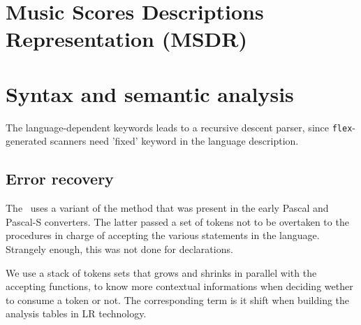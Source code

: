 \section{Music Scores Descriptions Representation (MSDR)}


\section{Syntax and semantic analysis}

The language-dependent keywords leads to a recursive descent parser, since {\tt flex}-generated scanners need 'fixed' keyword in the language description.


  \subsection{Error recovery}

The \msdLangComp\ uses a variant of the  method that was present in the early Pascal and Pascal-S converters. The latter passed a set of tokens not to be overtaken to the procedures in charge of accepting the various statements in the language. Strangely enough, this was not done for declarations.

We use a stack of tokens sets that grows and shrinks in parallel with the accepting functions, to know more contextual informations when deciding wether to consume a token or not. The corresponding term is {it shift}
when building the analysis tables in LR technology.


